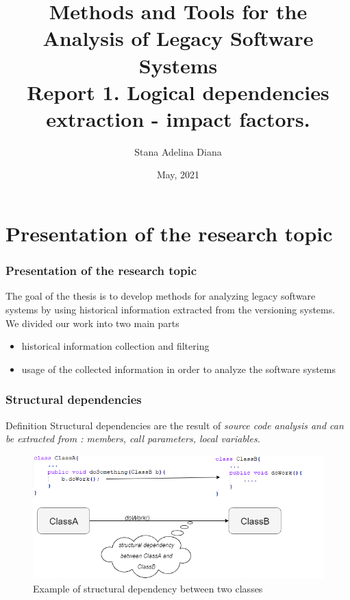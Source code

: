 \documentclass{beamer}
\title[Pres]{Methods and Tools for the Analysis of Legacy Software
Systems\\
Report 1. Logical dependencies extraction - impact factors.
 }
\author{Stana Adelina Diana}
\institute{Computer Science and Engineering Department\\
"Politehnica" University of Timisoara}
\date{May, 2021}
\begin{document}
\begin{frame}
  \titlepage
\end{frame}

\section{Presentation of the research topic}
 \begin{frame}
\frametitle{Presentation of the research topic}
The goal of the thesis is to develop methods for analyzing legacy software systems by using historical information extracted from the versioning systems.
We divided our work into two main parts

\begin{itemize}
\item historical information collection and filtering
\item usage of the collected information in order to analyze the software systems
\end{itemize}

\end{frame}


 \begin{frame}
\frametitle{Structural dependencies}
\begin{block}{Definition}
Structural dependencies are the result of \it{source code analysis} and can be extracted from : members, call parameters, local variables. 
\end{block}

\begin{center}
     \begin{figure}
	\includegraphics[width=\textwidth]{structural_dep.png}
	\caption{\label{fig:fig}Example of structural dependency between two classes}
     \end{figure}
\end{center}

\end{frame}
\end{document}
